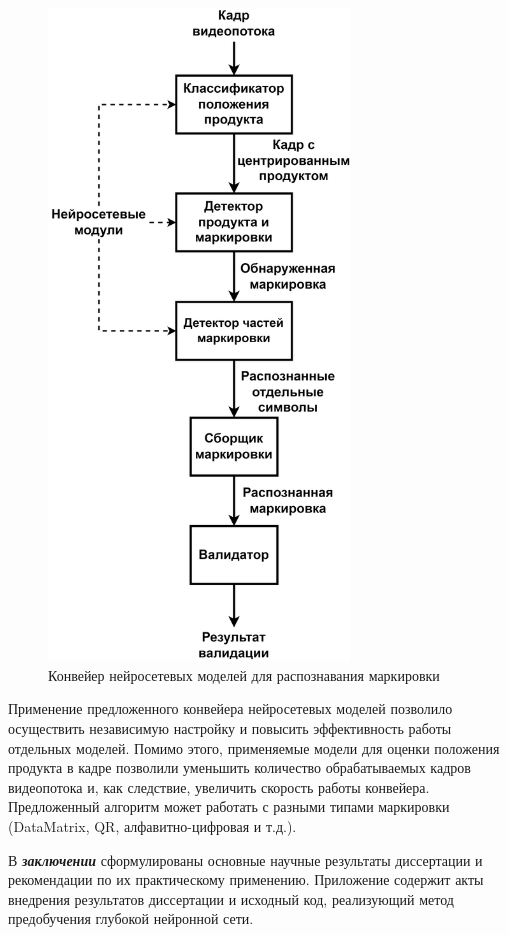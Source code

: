 \documentclass{thesisby}
\begin{document}
\begin{figure}[!ht]
	\centering
	\includegraphics[width=8cm]{man-source/images/ch4/savushkin_structure.png}
	\caption{Конвейер нейросетевых моделей для распознавания маркировки}
	\label{fig:general_diagram}
\end{figure}

Применение предложенного конвейера нейросетевых моделей позволило осуществить независимую настройку и повысить эффективность работы отдельных моделей. Помимо этого, применяемые модели для оценки положения продукта в кадре позволили уменьшить количество обрабатываемых кадров видеопотока и, как следствие, увеличить скорость работы конвейера. Предложенный алгоритм может работать с разными типами маркировки (DataMatrix, QR, алфавитно-цифровая и т.д.).
	
В \textbf{\textit{заключении}} сформулированы основные научные результаты диссертации и рекомендации по их практическому применению.
Приложение содержит акты внедрения результатов диссертации и исходный код, реализующий метод предобучения глубокой нейронной сети.
\end{document}
